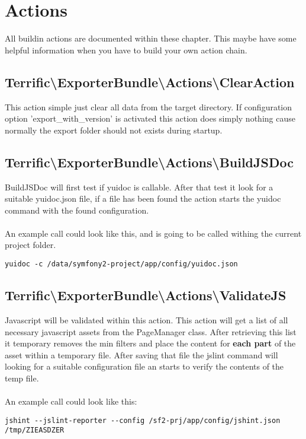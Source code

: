 \section{Actions}
All buildin actions are documented within these chapter. This maybe have some helpful information when you have to build your own action chain.

\subsection{Terrific\textnormal{\textbackslash}ExporterBundle\textnormal{\textbackslash}Actions\textnormal{\textbackslash}ClearAction}
This action simple just clear all data from the target directory. If configuration option 'export\_with\_version' is activated this action does simply nothing cause normally the export folder should not exists during startup.

\subsection{Terrific\textnormal{\textbackslash}ExporterBundle\textnormal{\textbackslash}Actions\textnormal{\textbackslash}BuildJSDoc}
BuildJSDoc will first test if yuidoc is callable. After that test it look for a suitable yuidoc.json file, if a file has been found the action starts the yuidoc command with the found configuration. \\
\\
An example call could look like this, and is going to be called withing the current project folder.
\begin{verbatim}
yuidoc -c /data/symfony2-project/app/config/yuidoc.json
\end{verbatim}

\subsection{Terrific\textnormal{\textbackslash}ExporterBundle\textnormal{\textbackslash}Actions\textnormal{\textbackslash}ValidateJS}
Javascript will be validated within this action. This action will get a list of all necessary javascript assets from the PageManager class. After retrieving this list it temporary removes the min filters and place the content for \textbf{each part} of the asset within a temporary file. After saving that file the jslint command will looking for a suitable configuration file an starts to verify the contents of the temp file. \\
\\
An example call could look like this:
\begin{verbatim}
jshint --jslint-reporter --config /sf2-prj/app/config/jshint.json /tmp/ZIEASDZER
\end{verbatim}


